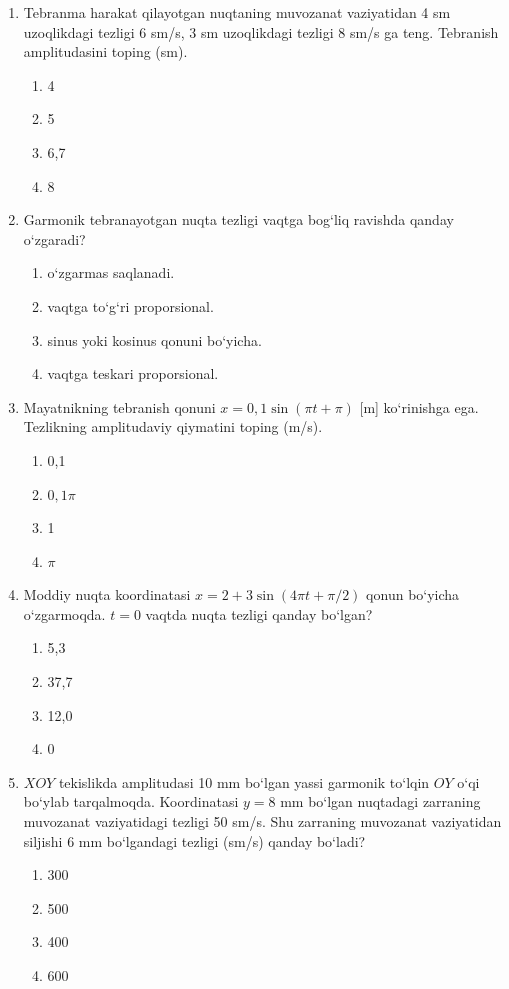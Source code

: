 \begin{enumerate}
\item Tebranma harakat qilayotgan nuqtaning muvozanat vaziyatidan 4 sm uzoqlikdagi tezligi 6 sm/s, 3 sm uzoqlikdagi tezligi 8 sm/s ga teng. Tebranish amplitudasini toping (sm).
\begin{enumerate}[label=\Alph*)]
\item 4
\item 5
\item 6,7
\item 8
\end{enumerate}

\item Garmonik tebranayotgan nuqta tezligi vaqtga bog‘liq ravishda qanday o‘zgaradi?
\begin{enumerate}[label=\Alph*)]
\item o‘zgarmas saqlanadi.
\item vaqtga to‘g‘ri proporsional.
\item sinus yoki kosinus qonuni bo‘yicha.
\item vaqtga teskari proporsional.
\end{enumerate}

\item Mayatnikning tebranish qonuni $x = 0,1 \sin(\pi t + \pi)$ [m] ko‘rinishga ega. Tezlikning amplitudaviy qiymatini toping (m/s).
\begin{enumerate}[label=\Alph*)]
\item 0,1
\item $0,1\pi$
\item 1
\item $\pi$
\end{enumerate}

\item Moddiy nuqta koordinatasi $x = 2 + 3 \sin(4\pi t + \pi/2)$ qonun bo‘yicha o‘zgarmoqda. $t = 0$ vaqtda nuqta tezligi qanday bo‘lgan?
\begin{enumerate}[label=\Alph*)]
\item 5,3
\item 37,7
\item 12,0
\item 0
\end{enumerate}

\item $XOY$ tekislikda amplitudasi 10 mm bo‘lgan yassi garmonik to‘lqin $OY$ o‘qi bo‘ylab tarqalmoqda. Koordinatasi $y = 8$ mm bo‘lgan nuqtadagi zarraning muvozanat vaziyatidagi tezligi 50 sm/s. Shu zarraning muvozanat vaziyatidan siljishi 6 mm bo‘lgandagi tezligi (sm/s) qanday bo‘ladi?
\begin{enumerate}[label=\Alph*)]
\item 300
\item 500
\item 400
\item 600
\end{enumerate}


\end{enumerate}
